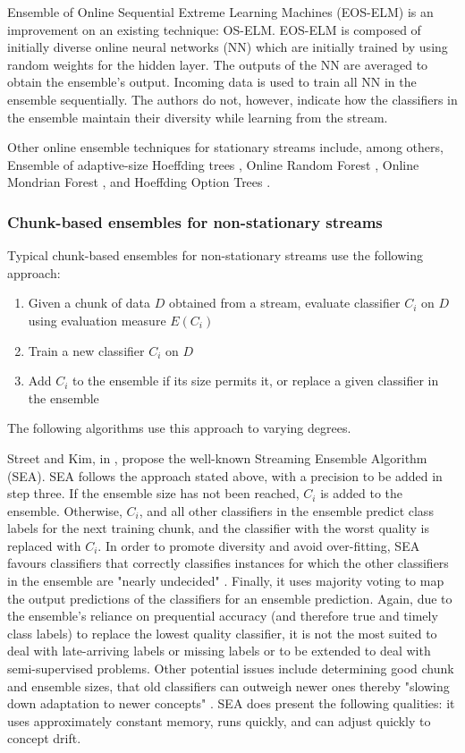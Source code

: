 Ensemble of Online Sequential Extreme Learning Machines (EOS-ELM) \cite{lan2009ensemble, KRAWCZYK2017132} is an improvement on an existing technique: OS-ELM. EOS-ELM is composed of initially diverse online neural networks (NN) which are initially trained by using random weights for the hidden layer. The outputs of the NN are averaged to obtain the ensemble's output. Incoming data is used to train all NN in the ensemble sequentially. The authors do not, however, indicate how the classifiers in the ensemble maintain their diversity while learning from the stream.

Other online ensemble techniques for stationary streams include, among others, Ensemble of adaptive-size Hoeffding trees \cite{bifet2009improving}, Online Random Forest \cite{denil2013consistency, saffari2009line}, Online Mondrian Forest \cite{lakshminarayanan2014mondrian}, and Hoeffding Option Trees \cite{gama2010knowledge}.

\subsubsection{Chunk-based ensembles for non-stationary streams}
Typical chunk-based ensembles for non-stationary streams use the following approach:
\begin{enumerate}
\item Given a chunk of data $D$ obtained from a stream, evaluate classifier $C_i$ on $D$ using evaluation measure $E(C_i)$
\item Train a new classifier $C_i$ on $D$
\item Add $C_i$ to the ensemble if its size permits it, or replace a given classifier in the ensemble
\end{enumerate}

The following algorithms use this approach to varying degrees.

Street and Kim, in \cite{street2001streaming}, propose the well-known Streaming Ensemble Algorithm (SEA). SEA follows the approach stated above, with a precision to be added in step three. If the ensemble size has not been reached, $C_i$ is added to the ensemble. Otherwise, $C_i$, and all other classifiers in the ensemble predict class labels for the next training chunk, and the classifier with the worst quality is replaced with $C_i$. In order to promote diversity and avoid over-fitting, SEA favours classifiers that correctly classifies instances for which the other classifiers in the ensemble are "nearly undecided" \cite{street2001streaming}. Finally, it uses majority voting to map the output predictions of the classifiers for an ensemble prediction. Again, due to the ensemble's reliance on prequential accuracy (and therefore true and timely class labels) to replace the lowest quality classifier, it is not the most suited to deal with late-arriving labels or missing labels or to be extended to deal with semi-supervised problems. Other potential issues include determining good chunk and ensemble sizes,  that old classifiers can outweigh newer ones thereby "slowing down adaptation to newer concepts" \cite{KRAWCZYK2017132}. SEA does present the following qualities: it uses approximately constant memory, runs quickly, and can adjust quickly to concept drift.

